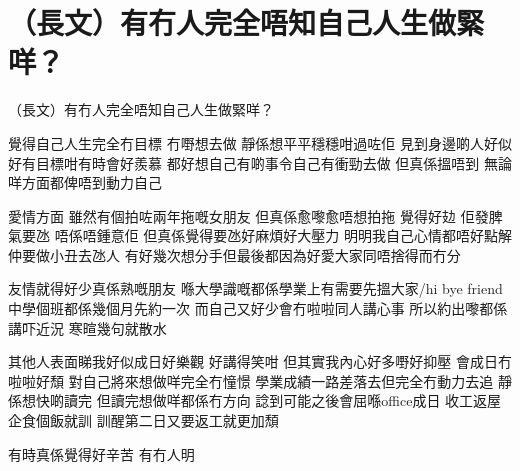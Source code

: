 \chapter{（長文）有冇人完全唔知自己人生做緊咩？}

（長文）有冇人完全唔知自己人生做緊咩？

覺得自己人生完全冇目標 冇嘢想去做 靜係想平平穩穩咁過咗佢 見到身邊啲人好似好有目標咁有時會好羨慕 都好想自己有啲事令自己有衝勁去做 但真係搵唔到 無論咩方面都俾唔到動力自己

愛情方面 雖然有個拍咗兩年拖嘅女朋友 但真係愈嚟愈唔想拍拖 覺得好攰 佢發脾氣要氹 唔係唔鍾意佢 但真係覺得要氹好麻煩好大壓力 明明我自己心情都唔好點解仲要做小丑去氹人 有好幾次想分手但最後都因為好愛大家同唔捨得而冇分

友情就得好少真係熟嘅朋友 喺大學識嘅都係學業上有需要先搵大家/hi bye friend 中學個班都係幾個月先約一次 而自己又好少會冇啦啦同人講心事 所以約出嚟都係講吓近況 寒暄幾句就散水

其他人表面睇我好似成日好樂觀 好講得笑咁 但其實我內心好多嘢好抑壓 會成日冇啦啦好頹 對自己將來想做咩完全冇憧憬 學業成績一路差落去但完全冇動力去追 靜係想快啲讀完 但讀完想做咩都係冇方向 諗到可能之後會屈喺office成日 收工返屋企食個飯就訓 訓醒第二日又要返工就更加頹

有時真係覺得好辛苦 有冇人明

